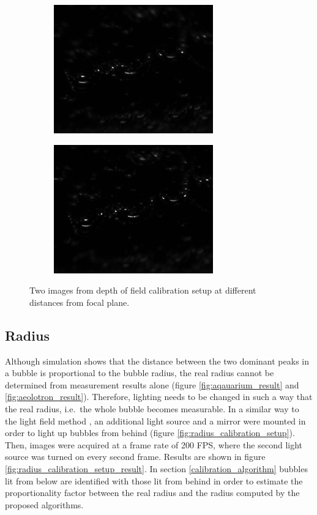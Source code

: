 			\begin{figure}
				\begin{subfigure}[b]{.55\textwidth}
					\centering
					\includegraphics[scale=.5]{images/dof_calib_1.png}
					\caption{}
				\end{subfigure}%
				\begin{subfigure}[b]{.55\textwidth}
					\centering
					\includegraphics[scale=.5]{images/dof_calib_2.png}
					\caption{}
				\end{subfigure}
				
				\caption{Two images from depth of field calibration setup at different distances from focal plane.}								
				\label{fig:depth_of_field_setup_result}
			\end{figure}
			
			
		\subsection{Radius}\label{sub:radius_setup}
			Although simulation shows that the distance between the two dominant peaks in a bubble is proportional to the bubble radius, the real radius cannot be determined from measurement results alone (figure \ref{fig:aqauarium_result} and \ref{fig:aeolotron_result}). Therefore, lighting needs to be changed in such a way that the real radius, i.e.\ the whole bubble becomes measurable. In a similar way to the light field method \cite{MischlerDiss}, an additional light source and a mirror were mounted in order to light up bubbles from behind (figure \ref{fig:radius_calibration_setup}). Then, images were acquired at a frame rate of 200 FPS, where the second light source was turned on every second frame. Results are shown in figure \ref{fig:radius_calibration_setup_result}. In section \ref{calibration_algorithm} bubbles lit from below are identified with those lit from behind in order to estimate the proportionality factor between the real radius and the radius computed by the proposed algorithms. 
			

